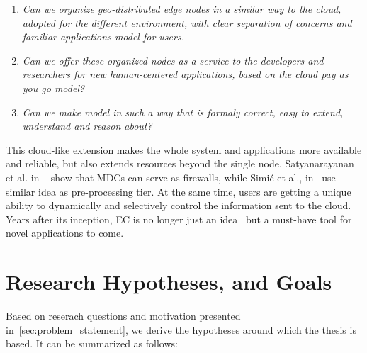 \begin{enumerate}[start=1,label={(\bfseries \arabic*)}]
	\item \textit{Can we organize geo-distributed edge nodes in a similar way to the cloud, adopted for the different  environment, with clear separation of concerns and familiar applications model for users.}
	\item \textit{Can we offer these organized nodes as a service to the developers and researchers for new human-centered applications, based on the cloud pay as you go model?}
	\item \textit{Can we make model in such a way that is formaly correct, easy to extend, understand and reason about?}
\end{enumerate}

This cloud-like extension makes the whole system and applications more available and reliable, but also extends resources beyond the single node. Satyanarayanan et al. in ~\cite{SatyanarayananK19} show that MDCs can serve as firewalls, while Simi\' c et al., in~\cite{inproceedingsSimic1} use similar idea as pre-processing tier. At the same time, users are getting a unique ability to dynamically and selectively control the information sent to the cloud. Years after its inception, EC is no longer just an idea~\cite{SatyanarayananK19} but a must-have tool for novel applications to come.
%
%
\section{Research Hypotheses, and Goals}\label{sec:research_hyphotesis_and_golas}
%
Based on reserach questions and motivation presented in~\ref{sec:problem_statement}, we derive the hypotheses around which the thesis is based. It can be summarized as follows:

